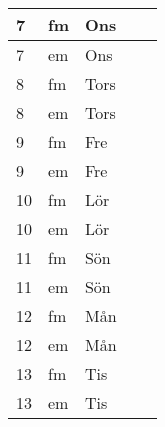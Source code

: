 \documentclass[a4paper]{article}
\begin{document}
\begin{table}[ht!]
\begin{tabular}{lllp{7cm}p{7cm}}
\multicolumn{1}{|l|}{7} & \multicolumn{1}{l|}{fm} & \multicolumn{1}{l|}{Ons} & \multicolumn{1}{l|}{} & \multicolumn{1}{l|}{} \\ \hline
\multicolumn{1}{|l|}{7} & \multicolumn{1}{l|}{em} & \multicolumn{1}{l|}{Ons} & \multicolumn{1}{l|}{} & \multicolumn{1}{l|}{} \\ \hline    

\multicolumn{1}{|l|}{8} & \multicolumn{1}{l|}{fm} & \multicolumn{1}{l|}{Tors} & \multicolumn{1}{l|}{} & \multicolumn{1}{l|}{} \\ \hline
\multicolumn{1}{|l|}{8} & \multicolumn{1}{l|}{em} & \multicolumn{1}{l|}{Tors} & \multicolumn{1}{l|}{} & \multicolumn{1}{l|}{} \\ \hline    

\multicolumn{1}{|l|}{9} & \multicolumn{1}{l|}{fm} & \multicolumn{1}{l|}{Fre} & \multicolumn{1}{l|}{} & \multicolumn{1}{l|}{} \\ \hline
\multicolumn{1}{|l|}{9} & \multicolumn{1}{l|}{em} & \multicolumn{1}{l|}{Fre} & \multicolumn{1}{l|}{} & \multicolumn{1}{l|}{} \\ \hline    

\multicolumn{1}{|l|}{10} & \multicolumn{1}{l|}{fm} & \multicolumn{1}{l|}{Lör} & \multicolumn{1}{l|}{} & \multicolumn{1}{l|}{} \\ \hline
\multicolumn{1}{|l|}{10} & \multicolumn{1}{l|}{em} & \multicolumn{1}{l|}{Lör} & \multicolumn{1}{l|}{} & \multicolumn{1}{l|}{} \\ \hline    

\multicolumn{1}{|l|}{11} & \multicolumn{1}{l|}{fm} & \multicolumn{1}{l|}{Sön} & \multicolumn{1}{l|}{} & \multicolumn{1}{l|}{} \\ \hline
\multicolumn{1}{|l|}{11} & \multicolumn{1}{l|}{em} & \multicolumn{1}{l|}{Sön} & \multicolumn{1}{l|}{} & \multicolumn{1}{l|}{} \\ \hline    

\multicolumn{1}{|l|}{12} & \multicolumn{1}{l|}{fm} & \multicolumn{1}{l|}{Mån} & \multicolumn{1}{l|}{} & \multicolumn{1}{l|}{} \\ \hline
\multicolumn{1}{|l|}{12} & \multicolumn{1}{l|}{em} & \multicolumn{1}{l|}{Mån} & \multicolumn{1}{l|}{} & \multicolumn{1}{l|}{} \\ \hline    

\multicolumn{1}{|l|}{13} & \multicolumn{1}{l|}{fm} & \multicolumn{1}{l|}{Tis} & \multicolumn{1}{l|}{} & \multicolumn{1}{l|}{} \\ \hline
\multicolumn{1}{|l|}{13} & \multicolumn{1}{l|}{em} & \multicolumn{1}{l|}{Tis} & \multicolumn{1}{l|}{} & \multicolumn{1}{l|}{} \\ \hline    


\end{tabular}
\end{table}
\end{document}
